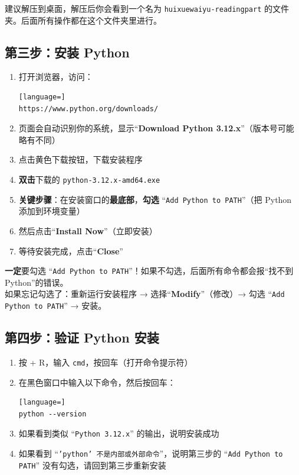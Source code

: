 \documentclass[12pt,a4paper]{ctexart}
\newcommand{\winR}{\faWindows{} + R}
\begin{document}
\begin{tipbox}
  建议解压到桌面，解压后你会看到一个名为 \texttt{huixuewaiyu-readingpart}
  的文件夹。后面所有操作都在这个文件夹里进行。
\end{tipbox}

\subsection{第三步：安装 Python}

\begin{enumerate}
  \item 打开浏览器，访问：
    \begin{lstlisting}[language=]
https://www.python.org/downloads/
\end{lstlisting}
  \item 页面会自动识别你的系统，显示``\textbf{Download Python 3.12.x}''（版本号可能略有不同）
  \item 点击黄色下载按钮，下载安装程序
  \item \textbf{双击}下载的 \texttt{python-3.12.x-amd64.exe}
  \item \textbf{关键步骤}：在安装窗口的\textbf{最底部}，\textbf{勾选}
    ``\texttt{Add Python to PATH}''（把 Python 添加到环境变量）
  \item 然后点击``\textbf{Install Now}''（立即安装）
  \item 等待安装完成，点击``\textbf{Close}''
\end{enumerate}

\begin{warnbox}
  \textbf{一定}要勾选 ``\texttt{Add Python to
  PATH}''！如果不勾选，后面所有命令都会报``找不到 Python''的错误。\\
  如果忘记勾选了：重新运行安装程序 → 选择``\textbf{Modify}''（修改）→ 勾选
  ``\texttt{Add Python to PATH}'' → 安装。
\end{warnbox}

\subsection{第四步：验证 Python 安装}

\begin{enumerate}
  \item 按 \winR，输入 \texttt{cmd}，按回车（打开命令提示符）
  \item 在黑色窗口中输入以下命令，然后按回车：
    \begin{lstlisting}[language=]
python --version
\end{lstlisting}
  \item 如果看到类似 ``\texttt{Python 3.12.x}'' 的输出，说明安装成功
  \item 如果看到 ``\texttt{'python' 不是内部或外部命令}''，说明第三步的
    ``\texttt{Add Python to PATH}'' 没有勾选，请回到第三步重新安装
\end{enumerate}
\end{document}

